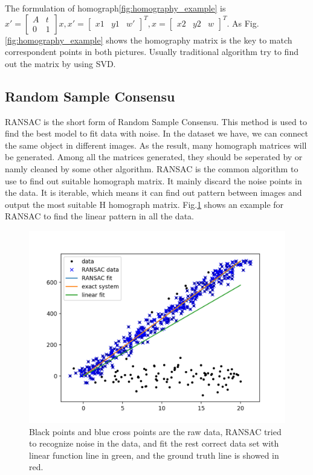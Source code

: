 \documentclass[senior]{IPSstyle}
\begin{document}
The formulation of homograph\ref{fig:homography_example} is $x' = \begin{bmatrix} A & t \\ 0 & 1 \end{bmatrix} x, x'= \begin{bmatrix} x1 & y1 & w' \end{bmatrix}^{T}, x= \begin{bmatrix} x2 & y2 & w \end{bmatrix}^{T}$.
As Fig.\ref{fig:homography_example} shows the homography matrix is the key to match correspondent points in both pictures.
Usually traditional algorithm try to find out the matrix by using SVD\cite{essig2010fully}.

\subsection{Random Sample Consensu}\label{section:RANSAC}
RANSAC is the short form of Random Sample Consensu\cite{wiki:RANSAC}.
This method is used to find the best model to fit data with noise.
In the dataset we have, we can connect the same object in different images.
As the result, many homograph matrices will be generated.
Among all the matrices generated, they should be seperated by or namly cleaned by some other algorithm.
RANSAC is the common algorithm to use to find out suitable homograph matrix.
It mainly discard the noise points in the data.
It is iterable, which means it can find out pattern between images and output the most suitable H homograph matrix.
Fig.\ref{fig:RANSAC} shows an example for RANSAC to find the linear pattern in all the data.

\begin{figure}[h!]
    \centering
    \includegraphics[width=15cm]{MasterThesis-master/images/RANSAC.png}
    \caption{Black points and blue cross points are the raw data, RANSAC tried to recognize noise in the data, and fit the rest correct data set with linear function line in green, and the ground truth line is showed in red.}
    \label{fig:RANSAC}
\end{figure}
\end{document}
